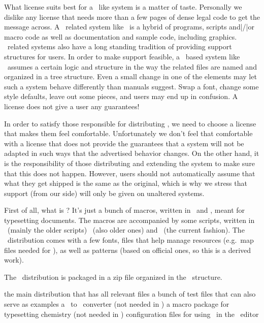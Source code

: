 What license suits best for a \TEX\ like system is a matter of taste. Personally
we dislike any license that needs more than a few pages of dense legal code to
get the message across. A \TEX\ related system like \CONTEXT\ is a hybrid of
programs, scripts and|/|or macro code as well as documentation and sample code,
including graphics. \TEX\ related systems also have a long standing tradition of
providing support structures for users. In order to make support feasible, a
\TEX\ based system like \CONTEXT\ assumes a certain logic and structure in the
way the related files are named and organized in a tree structure. Even a small
change in one of the elements may let such a system behave differently than
manuals suggest. Swap a font, change some style defaults, leave out some pieces,
and users may end up in confusion. A license does not give a user any guarantees!

In order to satisfy those responsible for distributing \CONTEXT, we need to
choose a license that makes them feel comfortable. Unfortunately we don't feel
that comfortable with a license that does not provide the guarantees that a
system will not be adapted in such ways that the advertised behavior changes. On
the other hand, it is the responsibility of those distributing and extending the
system to make sure that this does not happen. However, users should not
automatically assume that what they get shipped is the same as the original,
which is why we stress that support (from our side) will only be given on
unaltered systems.

First of all, what is \CONTEXT ? It's just a bunch of macros, written in \TEX\
and \METAPOST, meant for typesetting documents. The macros are accompanied by
some scripts, written in \PERL\ (mainly the older scripts) \RUBY\ (also older
ones) and \LUA\ (the current fashion). The \CONTEXT\ distribution comes with a
few fonts, files that help manage resources (e.g.\ map files needed for \MKII),
as well as patterns (based on official ones, so this is a derived work).

The \CONTEXT\ distribution is packaged in a zip file organized in the \TDS\
structure.

\starttabulate[|lT|p|]
\NC {} \NC the main distribution that has all relevant files \NC \NR
\NC \type {cont-tst.7z}  \NC a bunch of test files that can also serve as examples \NC \NR
\NC \type {cont-mpd.zip} \NC a \METAPOST\ to \PDF\ converter (not needed in \CONTEXT) \NC \NR
\NC \type {cont-ppc.zip} \NC a macro package for typesetting chemistry (not needed in \CONTEXT) \NC \NR
\NC \type {cont-sci.zip} \NC configuration files for using \CONTEXT\ in the \SCITE\ editor \NC \NR
\stoptabulate

